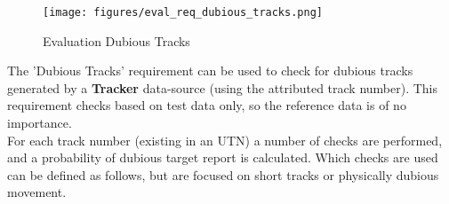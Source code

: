 \begin{figure}[H]
    \texttt{[image: figures/eval\_req\_dubious\_tracks.png]}
   \caption{Evaluation Dubious Tracks}
\end{figure}

The 'Dubious Tracks' requirement can be used to check for dubious tracks generated by a \textbf{Tracker} data-source (using the attributed track number). This requirement checks based on test data only, so the reference data is of no importance. \\

For each track number (existing in an UTN) a number of checks are performed, and a probability of dubious target report is calculated. Which checks are used can be defined as follows, but are focused on short tracks or physically dubious movement. \\

